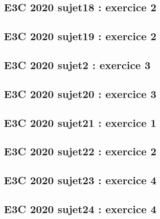 \documentclass[lang=fr,edition=teacher,layout=sheet]{mxbook}
\begin{document}
\par\bigskip
{}\subsection*{E3C 2020 sujet18 : exercice 2}
\begingroup\endgroup
\par\bigskip
{}\subsection*{E3C 2020 sujet19 : exercice 2}
\begingroup\endgroup
\par\bigskip
{}\subsection*{E3C 2020 sujet2 : exercice 3}
\begingroup\endgroup
\par\bigskip
{}\subsection*{E3C 2020 sujet20 : exercice 3}
\begingroup\endgroup
\par\bigskip
{}\subsection*{E3C 2020 sujet21 : exercice 1}
\begingroup\endgroup
\par\bigskip
{}\subsection*{E3C 2020 sujet22 : exercice 2}
\begingroup\endgroup
\par\bigskip
{}\subsection*{E3C 2020 sujet23 : exercice 4}
\begingroup\endgroup
\par\bigskip
{}\subsection*{E3C 2020 sujet24 : exercice 4}
\end{document}
